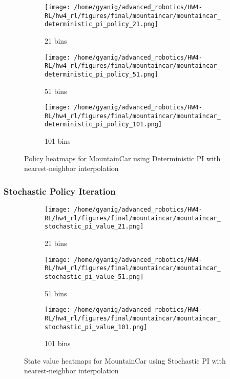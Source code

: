 \documentclass{article}
\begin{document}
\begin{figure}[H]
    \centering
    \begin{subfigure}{0.32\textwidth}
        \texttt{[image: /home/gyanig/advanced\_robotics/HW4-RL/hw4\_rl/figures/final/mountaincar/mountaincar\_deterministic\_pi\_policy\_21.png]}
        \caption{21 bins}
    \end{subfigure}
    \begin{subfigure}{0.32\textwidth}
        \texttt{[image: /home/gyanig/advanced\_robotics/HW4-RL/hw4\_rl/figures/final/mountaincar/mountaincar\_deterministic\_pi\_policy\_51.png]}
        \caption{51 bins}
    \end{subfigure}
    \begin{subfigure}{0.32\textwidth}
        \texttt{[image: /home/gyanig/advanced\_robotics/HW4-RL/hw4\_rl/figures/final/mountaincar/mountaincar\_deterministic\_pi\_policy\_101.png]}
        \caption{101 bins}
    \end{subfigure}
    \caption{Policy heatmaps for MountainCar using Deterministic PI with nearest-neighbor interpolation}
\end{figure}

\subsubsection{Stochastic Policy Iteration}
\begin{figure}[H]
    \centering
    \begin{subfigure}{0.32\textwidth}
        \texttt{[image: /home/gyanig/advanced\_robotics/HW4-RL/hw4\_rl/figures/final/mountaincar/mountaincar\_stochastic\_pi\_value\_21.png]}
        \caption{21 bins}
    \end{subfigure}
    \begin{subfigure}{0.32\textwidth}
        \texttt{[image: /home/gyanig/advanced\_robotics/HW4-RL/hw4\_rl/figures/final/mountaincar/mountaincar\_stochastic\_pi\_value\_51.png]}
        \caption{51 bins}
    \end{subfigure}
    \begin{subfigure}{0.32\textwidth}
        \texttt{[image: /home/gyanig/advanced\_robotics/HW4-RL/hw4\_rl/figures/final/mountaincar/mountaincar\_stochastic\_pi\_value\_101.png]}
        \caption{101 bins}
    \end{subfigure}
    \caption{State value heatmaps for MountainCar using Stochastic PI with nearest-neighbor interpolation}
\end{figure}
\end{document}
